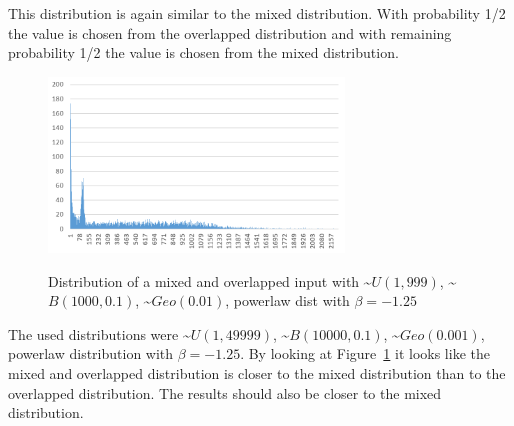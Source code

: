 This distribution is again similar to the mixed distribution.
With probability 1/2 the value is chosen from the overlapped distribution and with remaining probability 1/2 the value is chosen from the mixed distribution.

\begin{figure}[h]
      \caption{Distribution of a mixed and overlapped input with \textasciitilde$U(1,999)$, \textasciitilde$B(1000,0.1)$, \textasciitilde$Geo(0.01)$, powerlaw dist with $\beta=-1.25$}
      \centering
      \includegraphics[width=0.7\textwidth]{figures/images/numberGenerator/mixedAndOverlapped.png}\label{fig:mixAndOverlDistExample}
\end{figure}

The used distributions were \textasciitilde$U(1,49999)$, \textasciitilde$B(10000,0.1)$, \textasciitilde$Geo(0.001)$, powerlaw distribution with $\beta=-1.25$.
By looking at Figure~\ref{fig:mixAndOverlDistExample} it looks like the mixed and overlapped distribution is closer to the mixed distribution than to the overlapped distribution.
The results should also be closer to the mixed distribution.